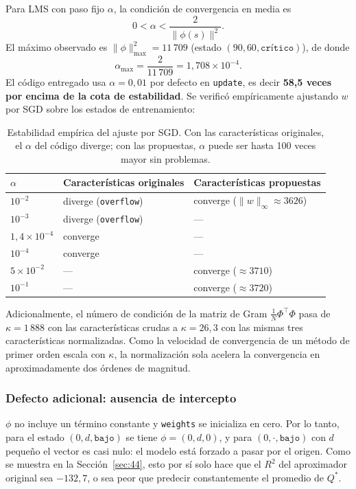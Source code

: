 \documentclass[11pt,letterpaper]{article}
\begin{document}
Para LMS con paso fijo $\alpha$, la condición de convergencia en media es
\[
  0 < \alpha < \frac{2}{\lVert\phi(s)\rVert^{2}}.
\]
El máximo observado es $\lVert\phi\rVert^{2}_{\max} = 11\,709$ (estado
$(90, 60, \texttt{crítico})$), de donde
\[
  \alpha_{\max} = \frac{2}{11\,709} = 1{,}708\times 10^{-4}.
\]
El código entregado usa $\alpha = 0{,}01$ por defecto en \texttt{update}, es decir
\textbf{58{,}5 veces por encima de la cota de estabilidad}. Se verificó
empíricamente ajustando $w$ por SGD sobre los estados de entrenamiento:

\begin{table}[h]
\centering
\begin{tabular}{lll}
\toprule
$\alpha$ & \textbf{Características originales} & \textbf{Características propuestas} \\
\midrule
$10^{-2}$   & diverge (\texttt{overflow}) & converge ($\lVert w\rVert_\infty \approx 3626$) \\
$10^{-3}$   & diverge (\texttt{overflow}) & --- \\
$1{,}4\times10^{-4}$ & converge & --- \\
$10^{-4}$   & converge & --- \\
$5\times10^{-2}$ & --- & converge ($\approx 3710$) \\
$10^{-1}$   & --- & converge ($\approx 3720$) \\
\bottomrule
\end{tabular}
\caption{Estabilidad empírica del ajuste por SGD. Con las características
originales, el $\alpha$ del código diverge; con las propuestas, $\alpha$ puede ser
hasta 100 veces mayor sin problemas.}
\end{table}

Adicionalmente, el número de condición de la matriz de Gram
$\frac{1}{N}\Phi^{\top}\Phi$ pasa de $\kappa = 1\,888$ con las características crudas
a $\kappa = 26{,}3$ con las mismas tres características normalizadas. Como la
velocidad de convergencia de un método de primer orden escala con $\kappa$, la
normalización sola acelera la convergencia en aproximadamente dos órdenes de
magnitud.

\subsubsection*{Defecto adicional: ausencia de intercepto}

$\phi$ no incluye un término constante y \texttt{weights} se inicializa en cero. Por
lo tanto, para el estado $(0, d, \texttt{bajo})$ se tiene $\phi = (0, d, 0)$, y para
$(0, \cdot, \texttt{bajo})$ con $d$ pequeño el vector es casi nulo: el modelo está
forzado a pasar por el origen. Como se muestra en la Sección~\ref{sec:44}, esto por
sí solo hace que el $R^2$ del aproximador original sea $-132{,}7$, o sea peor que
predecir constantemente el promedio de $Q^{*}$.
\end{document}
